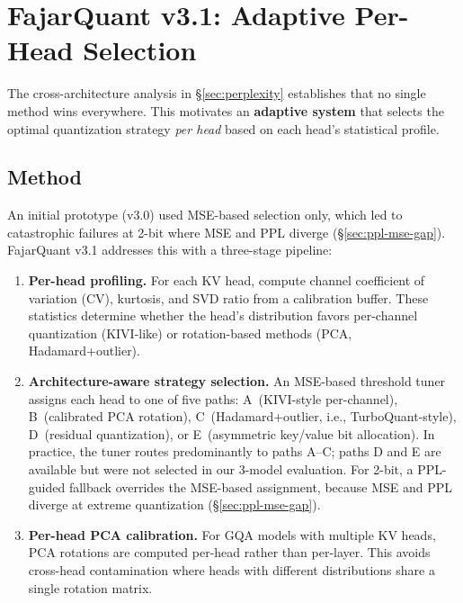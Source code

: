 \documentclass[10pt,twocolumn]{article}
\begin{document}
\section{FajarQuant v3.1: Adaptive Per-Head Selection}
\label{sec:v3}

The cross-architecture analysis in \S\ref{sec:perplexity} establishes
that no single method wins everywhere. This motivates an
\textbf{adaptive system} that selects the optimal quantization strategy
\emph{per head} based on each head's statistical profile.

\subsection{Method}

An initial prototype (v3.0) used MSE-based selection only, which led to
catastrophic failures at 2-bit where MSE and PPL diverge
(\S\ref{sec:ppl-mse-gap}). FajarQuant v3.1 addresses this with a
three-stage pipeline:

\begin{enumerate}[nosep]
\item \textbf{Per-head profiling.} For each KV head, compute channel
      coefficient of variation (CV), kurtosis, and SVD ratio from a
      calibration buffer. These statistics determine whether the head's
      distribution favors per-channel quantization (KIVI-like) or
      rotation-based methods (PCA, Hadamard+outlier).
\item \textbf{Architecture-aware strategy selection.} An MSE-based
      threshold tuner assigns each head to one of five paths:
      A~(KIVI-style per-channel), B~(calibrated PCA rotation),
      C~(Hadamard+outlier, i.e., TurboQuant-style), D~(residual
      quantization), or E~(asymmetric key/value bit allocation).
      In practice, the tuner routes predominantly to paths A--C;
      paths D and E are available but were not selected in our
      3-model evaluation. For 2-bit, a PPL-guided
      fallback overrides the MSE-based assignment, because MSE and PPL
      diverge at extreme quantization (\S\ref{sec:ppl-mse-gap}).
\item \textbf{Per-head PCA calibration.} For GQA models with multiple
      KV heads, PCA rotations are computed per-head rather than
      per-layer. This avoids cross-head contamination where heads with
      different distributions share a single rotation matrix.
\end{enumerate}
\end{document}
